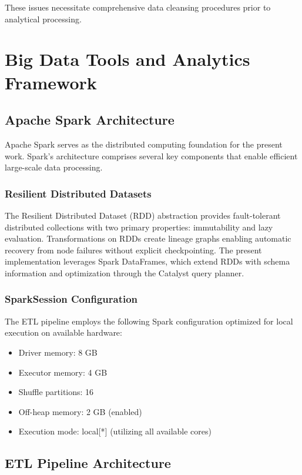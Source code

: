 \documentclass[12pt]{report}
\begin{document}
These issues necessitate comprehensive data cleansing procedures prior to analytical processing.

\section{Big Data Tools and Analytics Framework}

\subsection{Apache Spark Architecture}

Apache Spark serves as the distributed computing foundation for the present work. Spark's architecture comprises several key components that enable efficient large-scale data processing.

\subsubsection{Resilient Distributed Datasets}

The Resilient Distributed Dataset (RDD) abstraction provides fault-tolerant distributed collections with two primary properties: immutability and lazy evaluation. Transformations on RDDs create lineage graphs enabling automatic recovery from node failures without explicit checkpointing. The present implementation leverages Spark DataFrames, which extend RDDs with schema information and optimization through the Catalyst query planner.

\subsubsection{SparkSession Configuration}

The ETL pipeline employs the following Spark configuration optimized for local execution on available hardware:

\begin{itemize}
    \item Driver memory: 8 GB
    \item Executor memory: 4 GB
    \item Shuffle partitions: 16
    \item Off-heap memory: 2 GB (enabled)
    \item Execution mode: local[*] (utilizing all available cores)
\end{itemize}

\subsection{ETL Pipeline Architecture}
\end{document}
